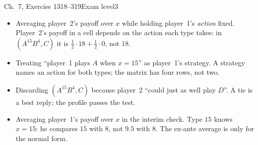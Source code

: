 \begin{exsol}{\MG{} Ch.~7, Exercise 1}{318--319}{Exam level}{3}
\mistakes
\begin{itemize}
  \item Averaging player~2's payoff over $x$ while holding player~1's \emph{action} fixed. Player~2's
  payoff in a cell depends on the action each type takes: in $(A^{15}B^{4}, C)$ it is
  $\frac12\cdot 18 + \frac12\cdot 0$, not $18$.
  \item Treating ``player~1 plays $A$ when $x = 15$'' as player~1's strategy. A strategy names an
  action for both types; the matrix has four rows, not two.
  \item Discarding $(A^{15}B^{4}, C)$ because player~2 ``could just as well play $D$''. A tie is a best
  reply; the profile passes the test.
  \item Averaging player~1's payoff over $x$ in the interim check. Type $15$ knows $x = 15$: he compares
  $15$ with $8$, not $9.5$ with $8$. The ex-ante average is only for the normal form.
\end{itemize}

\end{exsol}
